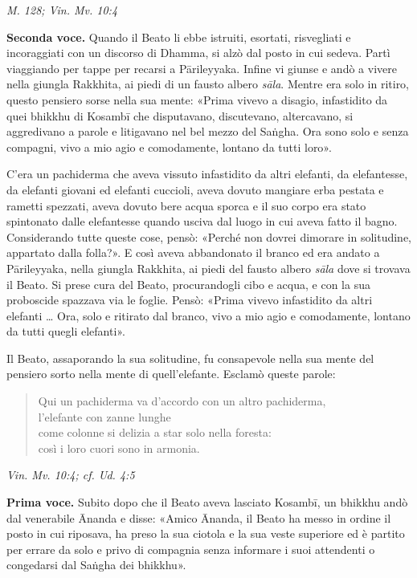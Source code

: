 \emph{M. 128; Vin. Mv. 10:4}


\textbf{Seconda voce.} Quando il Beato li ebbe istruiti, esortati, risvegliati e
incoraggiati con un discorso di Dhamma, si alzò dal posto in cui sedeva.
Partì viaggiando per tappe per recarsi a Pārileyyaka. Infine vi giunse e
andò a vivere nella giungla Rakkhita, ai piedi di un fausto albero
\emph{sāla}. Mentre era solo in ritiro, questo pensiero sorse nella sua
mente: «Prima vivevo a disagio, infastidito da quei bhikkhu di Kosambī
che disputavano, discutevano, altercavano, si aggredivano a parole e
litigavano nel bel mezzo del Saṅgha. Ora sono solo e senza compagni,
vivo a mio agio e comodamente, lontano da tutti loro».


C’era un pachiderma che aveva vissuto infastidito da altri elefanti, da
elefantesse, da elefanti giovani ed elefanti cuccioli, aveva dovuto
mangiare erba pestata e rametti spezzati, aveva dovuto bere acqua sporca
e il suo corpo era stato spintonato dalle elefantesse quando usciva dal
luogo in cui aveva fatto il bagno. Considerando tutte queste cose,
pensò: «Perché non dovrei dimorare in solitudine, appartato dalla
folla?». E così aveva abbandonato il branco ed era andato a Pārileyyaka,
nella giungla Rakkhita, ai piedi del fausto albero \emph{sāla} dove si
trovava il Beato. Si prese cura del Beato, procurandogli cibo e acqua, e
con la sua proboscide spazzava via le foglie. Pensò: «Prima vivevo
infastidito da altri elefanti … Ora, solo e ritirato dal branco, vivo a
mio agio e comodamente, lontano da tutti quegli elefanti».


Il Beato, assaporando la sua solitudine, fu consapevole nella sua mente
del pensiero sorto nella mente di quell’elefante. Esclamò queste parole:


\begin{quotation}
Qui un pachiderma va d’accordo con un altro pachiderma, \\
l’elefante con zanne lunghe \\
come colonne si delizia a star solo nella foresta: \\
così i loro cuori sono in armonia.
\end{quotation}

\emph{Vin. Mv. 10:4; cf. Ud. 4:5}


\textbf{Prima voce.} Subito dopo che il Beato aveva lasciato Kosambī, un bhikkhu
andò dal venerabile Ānanda e disse: «Amico Ānanda, il Beato ha messo in
ordine il posto in cui riposava, ha preso la sua ciotola e la sua veste
superiore ed è partito per errare da solo e privo di compagnia senza
informare i suoi attendenti o congedarsi dal Saṅgha dei bhikkhu».


